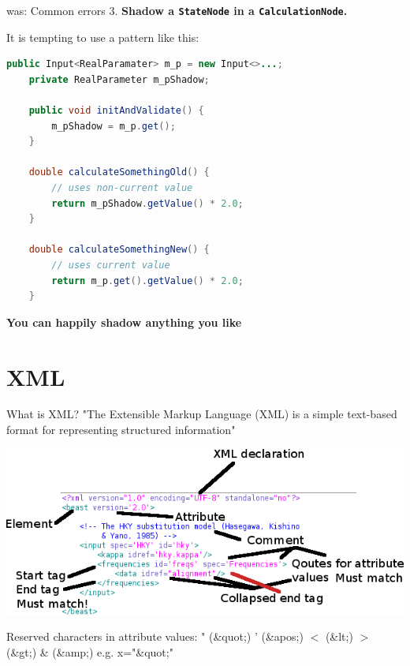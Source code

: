 \documentclass{beamer}
\theoremstyle{definition}
\begin{document}
\begin{frame}[containsverbatim]{was: Common errors}
3. {\bf\color{red} Shadow a {\tt StateNode} in a {\tt CalculationNode}.}

It is tempting to use a pattern like this:

\color{blue}\begin{lstlisting}[language=java]
public Input<RealParamater> m_p = new Input<>...;
    private RealParameter m_pShadow;

    public void initAndValidate() {
        m_pShadow = m_p.get();
    }
    
    double calculateSomethingOld() {
        // uses non-current value
        return m_pShadow.getValue() * 2.0;
    }

    double calculateSomethingNew() {
        // uses current value
        return m_p.get().getValue() * 2.0;
    }
\end{lstlisting}\vskip0.5cm

{\bf\color{green}You can happily shadow anything you like}


\end{frame}



\section{XML}

\begin{frame}{What is XML?}
"The Extensible Markup Language (XML) is a simple text-based format for representing structured information"\vskip1cm

\includegraphics[width=\textwidth]{xml.png}\vskip1cm

{\small Reserved characters in attribute values: " (\&quot;) ' (\&apos;) $<$ (\&lt;) $>$ (\&gt;) \& (\&amp;)
e.g. x="\&quot;"}

\end{frame}
\end{document}
